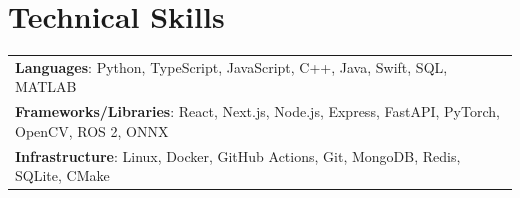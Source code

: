 \documentclass[letterpaper,11pt]{article}
\begin{document}
\vspace{-10pt}
\section{Technical Skills}
 \begin{itemize}[leftmargin=0in, label={}, topsep=0pt, itemsep=0pt]
    \small{\item{
     \renewcommand{\arraystretch}{1.10}
     \begin{tabular}[t]{@{}l@{}}
       \textbf{Languages}{: Python, TypeScript, JavaScript, C++, Java, Swift, SQL, MATLAB} \\[2pt]
       \textbf{Frameworks/Libraries}{: React, Next.js, Node.js, Express, FastAPI, PyTorch, OpenCV, ROS 2, ONNX} \\[2pt]
       \textbf{Infrastructure}{: Linux, Docker, GitHub Actions, Git, MongoDB, Redis, SQLite, CMake} \\[2pt]
     \end{tabular}
    }}
 \end{itemize}

\vspace{-16pt}
\end{document}
